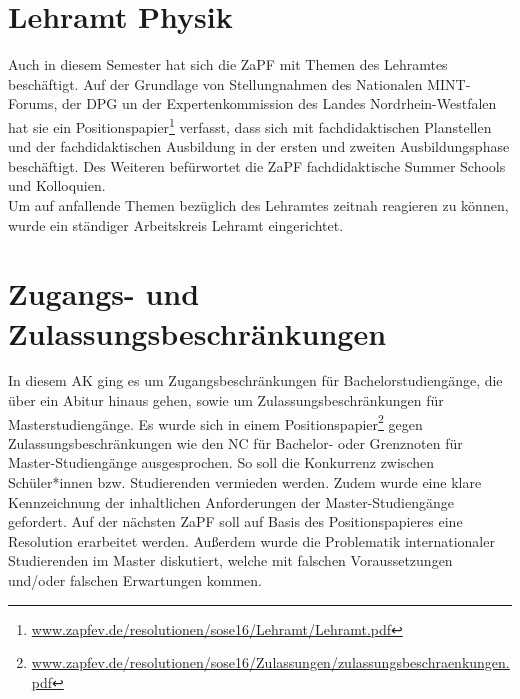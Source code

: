 \section*{Lehramt Physik}
Auch in diesem Semester hat sich die ZaPF mit Themen des Lehramtes beschäftigt. 
Auf der Grundlage von Stellungnahmen des Nationalen MINT-Forums, der DPG un der 
Expertenkommission des Landes Nordrhein-Westfalen hat sie ein Positionspapier\footnote{\href{http://www.zapfev.de/resolutionen/sose16/Lehramt/Lehramt.pdf}{\url{www.zapfev.de/resolutionen/sose16/Lehramt/Lehramt.pdf}}} verfasst, 
dass sich mit fachdidaktischen Planstellen und der fachdidaktischen Ausbildung in 
der ersten und zweiten Ausbildungsphase beschäftigt. Des Weiteren befürwortet die ZaPF 
fachdidaktische Summer Schools und Kolloquien. \\
Um auf anfallende Themen bezüglich des Lehramtes zeitnah reagieren zu können, wurde ein ständiger Arbeitskreis Lehramt eingerichtet. 


\section*{Zugangs- und Zulassungsbeschränkungen}
In diesem AK ging es um Zugangsbeschränkungen für Bachelorstudiengänge, 
die über ein Abitur hinaus gehen, sowie um Zulassungsbeschränkungen für Masterstudiengänge.
Es wurde sich in einem Positionspapier\footnote{\href{http://www.zapfev.de/resolutionen/sose16/Zulassungen/zulassungsbeschraenkungen.pdf}{\url{www.zapfev.de/resolutionen/sose16/Zulassungen/zulassungsbeschraenkungen.pdf}}} gegen Zulassungsbeschränkungen wie den 
NC für Bachelor- oder Grenznoten für Master-Studiengänge ausgesprochen. 
So soll die Konkurrenz zwischen Schüler*innen bzw. Studierenden vermieden werden. 
Zudem wurde eine klare Kennzeichnung der inhaltlichen Anforderungen der Master-Studiengänge gefordert. 
Auf der nächsten ZaPF soll auf Basis des Positionspapieres eine Resolution erarbeitet werden. 
Außerdem wurde die Problematik internationaler Studierenden im Master diskutiert, 
welche mit falschen Voraussetzungen und/oder falschen Erwartungen kommen. \\


